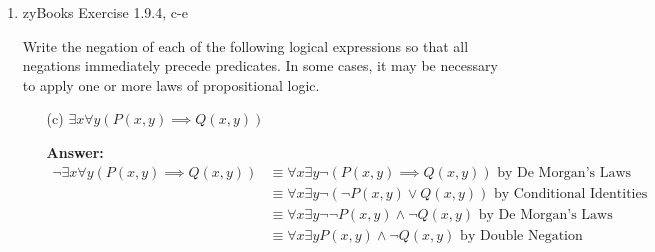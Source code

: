 \documentclass[12pt]{extreport}
\newcommand{\answer}[0]{\medskip \textbf{Answer:} \medskip}
\begin{document}
\begin{enumerate}
\begin{enumerate}
                \medskip

                Step 3:

                There is a patient who was given the placebo and did not have a migraine.

            \item[(e)] There is a patient who had migraines and was given the placebo.
            
                \answer

                Step 1:

                \( \exists x M(x) \land P(x) \)

                \medskip

                Step 2:
                \begin{align*}
                    \neg \exists x M(x) \land P(x) &\equiv \forall x \neg (M(x) \land P(x)) \\
                                                   &\equiv \forall x \neg M(x) \lor \neg P(x)
                \end{align*}

                \medskip

                Step 3:

                Every patient did not have or did not receive a placebo.

        \end{enumerate}

    \item zyBooks Exercise 1.9.4, c-e
    
    Write the negation of each of the following logical expressions so that all negations immediately precede predicates. In some cases, it may be necessary to apply one or more laws of propositional logic.

        \begin{enumerate}
            
            \item[(c)] \( \exists x \forall y (P(x, y) \implies Q(x, y)) \)
            
                \answer
                \begin{align*}
                    \neg \exists x \forall y (P(x, y) \implies Q(x, y)) &\equiv \forall x \exists y \neg (P(x, y) \implies Q(x,y)) \text{ by De Morgan's Laws}\\
                        &\equiv \forall x \exists y \neg (\neg P(x, y) \lor Q(x, y)) \text{ by Conditional Identities} \\
                        &\equiv \forall x \exists y \neg \neg P(x, y) \land \neg Q(x, y) \text{ by De Morgan's Laws} \\
                        &\equiv \forall x \exists y P(x, y) \land \neg Q(x, y) \text{ by Double Negation}
                \end{align*}


\end{enumerate}
\end{enumerate}
\end{document}
